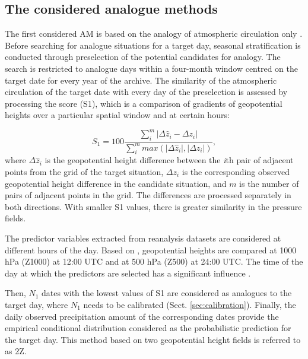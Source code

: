 \documentclass[hess, manuscript]{copernicus}
\begin{document}
	\subsection{The considered analogue methods}
	\label{sec:analog_method}
	
	The first considered AM is based on the analogy of atmospheric circulation only \citep[Table \ref{table:method_2Z};][]{Obled2002, Bontron2005}. Before searching for analogue situations for a target day, seasonal stratification is conducted through preselection of the potential candidates for analogy. The search is restricted to analogue days within a four-month window centred on the target date for every year of the archive. The similarity of the atmospheric circulation of the target date with every day of the preselection is assessed by processing the \citet{Teweles1954} score (S1), which is a comparison of gradients of geopotential heights over a particular spatial window and at certain hours:
	
	\begin{equation}
	\label{eq:S1}
	S_{1}=100 \frac {\displaystyle \sum_{i}^{m} \vert \Delta\hat{z}_{i} - \Delta z_{i} \vert}
	{\displaystyle \sum_{i}^{m} max( \vert \Delta\hat{z}_{i} \vert , \vert \Delta z_{i} \vert ) } ,
	\end{equation}
	where $\Delta \hat{z}_{i}$ is the geopotential height difference between the \textit{i}th pair of adjacent points from the grid of the target situation, $\Delta z_{i}$ is the corresponding observed geopotential height difference in the candidate situation, and $m$ is the number of pairs of adjacent points in the grid. The differences are processed separately in both directions. With smaller S1 values, there is greater similarity in the pressure fields.
	
	The predictor variables extracted from reanalysis datasets are considered at different hours of the day. Based on \citet{Bontron2005}, geopotential heights are compared at 1000 hPa (Z1000) at 12:00 UTC and at 500 hPa (Z500) at 24:00 UTC. The time of the day at which the predictors are selected has a significant influence \citep{Bontron2004}.
	
	Then, $N_{1}$ dates with the lowest values of S1 are considered as analogues to the target day, where $N_{1}$ needs to be calibrated (Sect. \ref{sec:calibration}). Finally, the daily observed precipitation amount of the corresponding dates provide the empirical conditional distribution considered as the probabilistic prediction for the target day. This method based on two geopotential height fields is referred to as 2Z.
	
\end{document}
